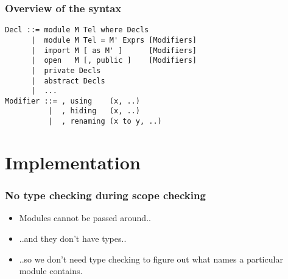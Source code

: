 \documentclass{beamer}
\newenvironment{agda}{
\begin{block}{}\small
}{
\end{block}
}
\begin{document}
\begin{frame}[fragile]
  \frametitle{Overview of the syntax}

\begin{agda}
\begin{verbatim}
Decl ::= module M Tel where Decls
      |  module M Tel = M' Exprs [Modifiers]
      |  import M [ as M' ]      [Modifiers]
      |  open   M [, public ]    [Modifiers]
      |  private Decls
      |  abstract Decls
      |  ...
Modifier ::= , using    (x, ..)
          |  , hiding   (x, ..)
          |  , renaming (x to y, ..)
\end{verbatim}
\end{agda}
\end{frame}

\section{Implementation}




\begin{frame}[fragile]
  \frametitle{No type checking during scope checking}

  \begin{itemize}
    \item Modules cannot be passed around..
    \item ..and they don't have types..
    \item ..so we don't need type checking to figure out what names a particular
    module contains.
  \end{itemize}
\end{frame}
\end{document}
